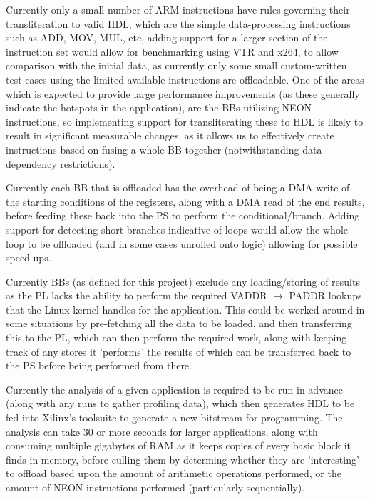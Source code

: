 \documentclass[a4paper]{article}
\begin{document}
Currently only a small number of ARM instructions have rules governing their transliteration to valid HDL, which are the simple data-processing instructions such as ADD, MOV, MUL, etc, adding support for a larger section of the instruction set would allow for benchmarking using VTR and x264, to allow comparison with the initial data, as currently only some small custom-written test cases using the limited available instructions are offloadable.
One of the areas which is expected to provide large performance improvements (as these generally indicate the hotspots in the application), are the BBs utilizing NEON instructions, so implementing support for transliterating these to HDL is likely to result in significant measurable changes, as it allows us to effectively create instructions based on fusing a whole BB together (notwithstanding data dependency restrictions).

Currently each BB that is offloaded has the overhead of being a DMA write of the starting conditions of the registers, along with a DMA read of the end results, before feeding these back into the PS to perform the conditional/branch. Adding support for detecting short branches indicative of loops would allow the whole loop to be offloaded (and in some cases unrolled onto logic) allowing for possible speed ups.

Currently BBs (as defined for this project) exclude any loading/storing of results as the PL lacks the ability to perform the required VADDR $\rightarrow$ PADDR lookups that the Linux kernel handles for the application. This could be worked around in some situations by pre-fetching all the data to be loaded, and then transferring this to the PL, which can then perform the required work, along with keeping track of any stores it 'performs' the results of which can be transferred back to the PS before being performed from there.

Currently the analysis of a given application is required to be run in advance (along with any runs to gather profiling data), which then generates HDL to be fed into Xilinx's toolsuite to generate a new bitstream for programming. The analysis can take 30 or more seconds for larger applications, along with consuming multiple gigabytes of RAM as it keeps copies of every basic block it finds in memory, before culling them by determing whether they are 'interesting' to offload based upon the amount of arithmetic operations performed, or the amount of NEON instructions performed (particularly sequentially).

\end{document}
